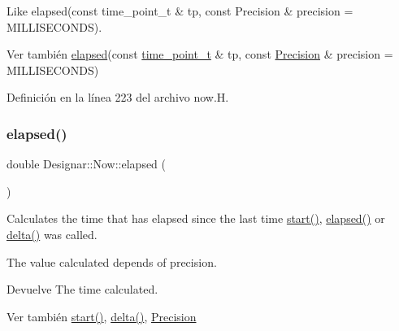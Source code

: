 Like elapsed(const time\+\_\+point\+\_\+t \& tp, const Precision \& precision = M\+I\+L\+L\+I\+S\+E\+C\+O\+N\+DS).

\begin{DoxySeeAlso}{Ver también}
\hyperlink{class_designar_1_1_now_a3219d85172fc9628ef90f66c1d69a8e0}{elapsed}(const \hyperlink{namespace_designar_a0edbd598eadb672df2c70e5af4dfccee}{time\+\_\+point\+\_\+t} \& tp, const \hyperlink{class_designar_1_1_now_a3c9f5e57907c88cbe63c70a64638c072}{Precision} \& precision = M\+I\+L\+L\+I\+S\+E\+C\+O\+N\+DS) 
\end{DoxySeeAlso}


Definición en la línea 223 del archivo now.\+H.

\mbox{\label{class_designar_1_1_now_a3219d85172fc9628ef90f66c1d69a8e0}} 
\subsubsection{\texorpdfstring{elapsed()}{elapsed()}\hspace{0.1cm}{\footnotesize\ttfamily [1/2]}}
{\footnotesize\ttfamily double Designar\+::\+Now\+::elapsed (\begin{DoxyParamCaption}{ }\end{DoxyParamCaption})\hspace{0.3cm}{\ttfamily [inline]}}

Calculates the time that has elapsed since the last time \hyperlink{class_designar_1_1_now_a7ccb419799b46b7786b9ad0ac231de14}{start()}, \hyperlink{class_designar_1_1_now_a3219d85172fc9628ef90f66c1d69a8e0}{elapsed()} or \hyperlink{class_designar_1_1_now_ae2a46a7ff8392fbadc9fb28ee17f7f5a}{delta()} was called.

The value calculated depends of precision.

\begin{DoxyReturn}{Devuelve}
The time calculated. 
\end{DoxyReturn}
\begin{DoxySeeAlso}{Ver también}
\hyperlink{class_designar_1_1_now_a7ccb419799b46b7786b9ad0ac231de14}{start()}, \hyperlink{class_designar_1_1_now_ae2a46a7ff8392fbadc9fb28ee17f7f5a}{delta()}, \hyperlink{class_designar_1_1_now_a3c9f5e57907c88cbe63c70a64638c072}{Precision} 
\end{DoxySeeAlso}


